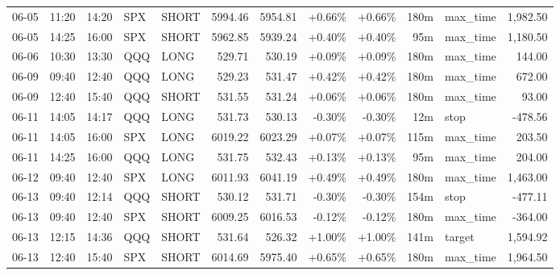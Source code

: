 \documentclass[11pt,a4paper,twoside]{article}
\begin{document}
\begin{center}
\begin{longtable}{>{\color{txtmain}}l l l l l r r r r r >{\color{txtmain}}l r}
06-05 & 11:20 & 14:20 & SPX & SHORT & 5994.46 & 5954.81 & \textcolor{wingreen}{+0.66\%} & \textcolor{wingreen}{+0.66\%} & 180m & max\_time & \textcolor{wingreen}{1,982.50} \\
06-05 & 14:25 & 16:00 & SPX & SHORT & 5962.85 & 5939.24 & \textcolor{wingreen}{+0.40\%} & \textcolor{wingreen}{+0.40\%} & 95m & max\_time & \textcolor{wingreen}{1,180.50} \\
06-06 & 10:30 & 13:30 & QQQ & LONG & 529.71 & 530.19 & \textcolor{wingreen}{+0.09\%} & \textcolor{wingreen}{+0.09\%} & 180m & max\_time & \textcolor{wingreen}{144.00} \\
06-09 & 09:40 & 12:40 & QQQ & LONG & 529.23 & 531.47 & \textcolor{wingreen}{+0.42\%} & \textcolor{wingreen}{+0.42\%} & 180m & max\_time & \textcolor{wingreen}{672.00} \\
06-09 & 12:40 & 15:40 & QQQ & SHORT & 531.55 & 531.24 & \textcolor{wingreen}{+0.06\%} & \textcolor{wingreen}{+0.06\%} & 180m & max\_time & \textcolor{wingreen}{93.00} \\
06-11 & 14:05 & 14:17 & QQQ & LONG & 531.73 & 530.13 & \textcolor{lossred}{-0.30\%} & \textcolor{lossred}{-0.30\%} & 12m & stop & \textcolor{lossred}{-478.56} \\
06-11 & 14:05 & 16:00 & SPX & LONG & 6019.22 & 6023.29 & \textcolor{wingreen}{+0.07\%} & \textcolor{wingreen}{+0.07\%} & 115m & max\_time & \textcolor{wingreen}{203.50} \\
06-11 & 14:25 & 16:00 & QQQ & LONG & 531.75 & 532.43 & \textcolor{wingreen}{+0.13\%} & \textcolor{wingreen}{+0.13\%} & 95m & max\_time & \textcolor{wingreen}{204.00} \\
06-12 & 09:40 & 12:40 & SPX & LONG & 6011.93 & 6041.19 & \textcolor{wingreen}{+0.49\%} & \textcolor{wingreen}{+0.49\%} & 180m & max\_time & \textcolor{wingreen}{1,463.00} \\
06-13 & 09:40 & 12:14 & QQQ & SHORT & 530.12 & 531.71 & \textcolor{lossred}{-0.30\%} & \textcolor{lossred}{-0.30\%} & 154m & stop & \textcolor{lossred}{-477.11} \\
06-13 & 09:40 & 12:40 & SPX & SHORT & 6009.25 & 6016.53 & \textcolor{lossred}{-0.12\%} & \textcolor{lossred}{-0.12\%} & 180m & max\_time & \textcolor{lossred}{-364.00} \\
06-13 & 12:15 & 14:36 & QQQ & SHORT & 531.64 & 526.32 & \textcolor{wingreen}{+1.00\%} & \textcolor{wingreen}{+1.00\%} & 141m & target & \textcolor{wingreen}{1,594.92} \\
06-13 & 12:40 & 15:40 & SPX & SHORT & 6014.69 & 5975.40 & \textcolor{wingreen}{+0.65\%} & \textcolor{wingreen}{+0.65\%} & 180m & max\_time & \textcolor{wingreen}{1,964.50} \\

\end{longtable}
\end{center}
\end{document}
